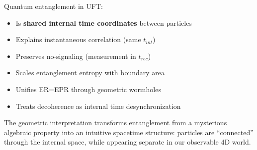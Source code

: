 \begin{insight}
Quantum entanglement in UFT:
\begin{itemize}
    \item Is \textbf{shared internal time coordinates} between particles
    \item Explains instantaneous correlation (same $t_{int}$)
    \item Preserves no-signaling (measurement in $t_{rec}$)
    \item Scales entanglement entropy with boundary area
    \item Unifies ER=EPR through geometric wormholes
    \item Treats decoherence as internal time desynchronization
\end{itemize}
\end{insight}

The geometric interpretation transforms entanglement from a mysterious algebraic property into an intuitive spacetime structure: particles are ``connected'' through the internal space, while appearing separate in our observable 4D world.
